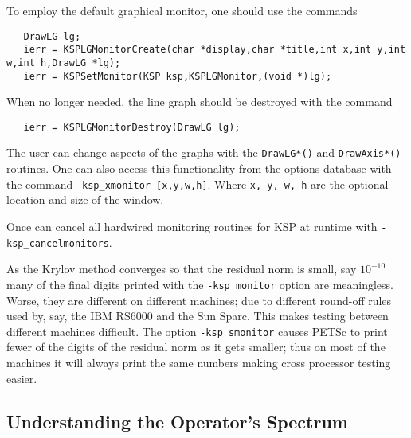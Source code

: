 To employ the default graphical monitor, one should use the 
commands  
\begin{verbatim}
   DrawLG lg;
   ierr = KSPLGMonitorCreate(char *display,char *title,int x,int y,int w,int h,DrawLG *lg);
   ierr = KSPSetMonitor(KSP ksp,KSPLGMonitor,(void *)lg);
\end{verbatim}
When no longer needed, the line graph should be destroyed 
with the command
\begin{verbatim}
   ierr = KSPLGMonitorDestroy(DrawLG lg);
\end{verbatim}
The user can change aspects of the graphs with the {\tt DrawLG*()} and 
{\tt DrawAxis*()} routines.  
One can also access this functionality from the options database 
with the command {\tt -ksp\_xmonitor [x,y,w,h]}.  
Where {\tt x, y, w, h} are the optional location and size of the window.

Once can cancel all hardwired monitoring routines for KSP at runtime with 
{\tt -ksp\_cancelmonitors}. 

As the Krylov method converges so that the residual norm is small,
say $ 10^{-10} $ many of the final digits printed with the {\tt -ksp\_monitor}
option are meaningless. Worse, they are different on different 
machines; due to different round-off rules used by, say, the IBM RS6000
and the Sun Sparc. This makes testing between different machines
difficult. The option {\tt -ksp\_smonitor} 
causes PETSc to print fewer of the digits of the residual norm 
as it gets smaller; thus on most of the machines it will always
print the same numbers making cross processor testing easier.


\subsection{Understanding the Operator's Spectrum}

